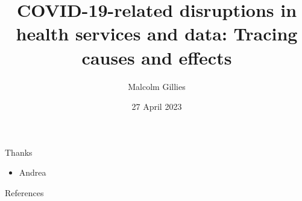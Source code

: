 \documentclass[aspectratio=169,12pt]{beamer} %
\title{COVID-19-related disruptions in health services and data: Tracing causes and effects}
\author{Malcolm Gillies}
\date{27 April 2023}
\begin{document}
{
\begin{frame}
\titlepage
\end{frame}
}

\begin{frame}{Thanks}
    \begin{itemize}
        \item Andrea
    \end{itemize}
\end{frame}

\begin{frame}{References}
%        
%        
        \tiny
        
\end{frame}
\end{document}
